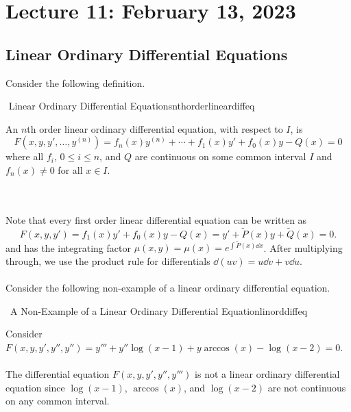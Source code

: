 \section{Lecture 11: February 13, 2023}

    \subsection{Linear Ordinary Differential Equations}

        Consider the following definition.
        \begin{definition}{\Stop\,\,Linear Ordinary Differential Equations}{nthorderlineardiffeq}

            An \(n\)th order linear ordinary differential equation, with respect to \(I\), is
            \begin{equation*}
                F(x,y,y',\ldots,y^{(n)})=f_n(x)y^{(n)}+\cdots+f_1(x)y'+f_0(x)y-Q(x)=0
            \end{equation*}
            where all \(f_i\), \(0\leq i\leq n\), and \(Q\) are continuous on some common interval \(I\) and \(f_n(x)\neq0\) for all \(x\in I\).
            
        \end{definition}
        \vphantom
        \\
        \\
        Note that every first order linear differential equation can be written as 
        \begin{equation*}
            F(x,y,y')=f_1(x)y'+f_0(x)y-Q(x)=y'+\tilde{P}(x)y+\tilde{Q}(x)=0.
        \end{equation*}
        and has the integrating factor \(\mu(x,y)=\mu(x)=e^{\int \tilde{P}(x)\dd x}\). After multiplying through, we use the product rule for differentials \(\dd(uv)=u\dd v+v\dd u\).
        \\
        \\
        Consider the following non-example of a linear ordinary differential equation.
        \begin{example}{\Difficulty\,\Difficulty\,\,A Non-Example of a Linear Ordinary Differential Equation}{linorddiffeq}

            Consider \(F(x,y,y',y'',y'')=y'''+y''\log(x-1)+y\arccos(x)-\log(x-2)=0\).
            \\
            \\
            The differential equation \(F(x,y,y',y'',y''')\) is not a linear ordinary differential equation since \(\log(x-1)\), \(\arccos(x)\), and \(\log(x-2)\) are not continuous on any common interval.
            
        \end{example}

